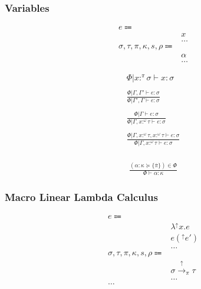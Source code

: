 \documentclass {article}
\begin{document}
\subsubsection{Variables}
\begin{align*}
e \Coloneqq & \\
& x \tag{Variable} \\
& \dots \\
\sigma, \tau, \pi, \kappa, s, \rho \Coloneqq & \\
& \alpha \tag{Type Variable} \\
& \dots
\end{align*}

\begin{gather*}
\Phi | x :^\pi \sigma \vdash x : \sigma \\
\\
\frac
{\Phi | \Gamma, \Gamma' \vdash e : \sigma}
{\Phi | \Gamma', \Gamma \vdash e : \sigma} \\
\\
\frac
{\Phi | \Gamma \vdash e : \sigma}
{\Phi | \Gamma, x :^\omega \tau \vdash e : \sigma } \\
\\
\frac
{\Phi | \Gamma, x :^\omega \tau, x :^\omega \tau \vdash e : \sigma}
{\Phi | \Gamma, x :^\omega \tau \vdash e : \sigma } \\
\end{gather*}

\begin{gather*}
\frac
{(\alpha : \kappa \succeq \{ \overline \pi \} ) \in \Phi}
{\Phi \vdash \alpha : \kappa}
\end{gather*}

\subsubsection{Macro Linear Lambda Calculus}
\begin{align*}
e \Coloneqq & \\
& \lambda^\uparrow x. e \tag{Macro Lambda}\\
& e(^\uparrow e') \tag{Macro Application}\\
& \dots \\
\sigma, \tau, \pi, \kappa, s, \rho \Coloneqq & \\
& \sigma \xrightarrow{\uparrow}_\pi \tau \tag{Macro} \\
& \dots \\
\dots
\end{align*}
\end{document}
